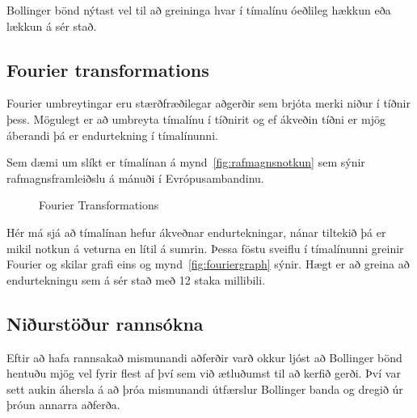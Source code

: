 \documentclass{article}
\begin{document}
Bollinger bönd nýtast vel til að greininga hvar í
tímalínu óeðlileg hækkun eða lækkun á sér stað.




\subsection{Fourier transformations} 

Fourier umbreytingar eru stærðfræðilegar aðgerðir sem brjóta merki niður í tíðnir þess. 
Mögulegt er að umbreyta tímalínu í tíðnirit og ef ákveðin tíðni er mjög áberandi 
þá er endurtekning í tímalínunni. 

Sem dæmi um slíkt er tímalínan á mynd~\ref{fig:rafmagnsnotkun} sem sýnir
rafmagnsframleiðslu á mánuði í Evrópusambandinu.


\begin{figure}[H]
  \centering 
      \caption{Fourier Transformations}
  \label{fig:fourier}
\end{figure}

Hér má sjá að tímalínan hefur ákveðnar endurtekningar, nánar tiltekið þá er mikil notkun á veturna en lítil á sumrin.
Þessa föstu sveiflu í tímalínunni greinir Fourier og skilar grafi eins og mynd~\ref{fig:fouriergraph} sýnir. 
Hægt er að greina að endurtekningu sem á sér stað með 12 staka millibili.

\subsection{Niðurstöður rannsókna}
Eftir að hafa rannsakað mismunandi aðferðir varð okkur ljóst að Bollinger bönd hentuðu
mjög vel fyrir flest af því sem við ætluðumst til að kerfið gerði.
Því var sett aukin áhersla á að þróa mismunandi útfærslur Bollinger banda og
dregið úr þróun annarra aðferða. 
\newpage
\end{document}
